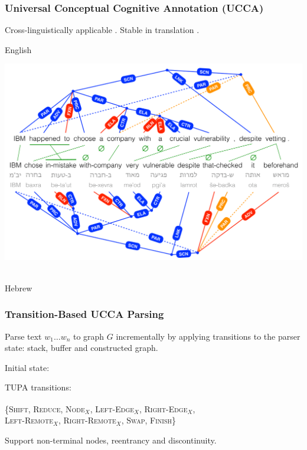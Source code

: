 \documentclass[t,xcolor={svgnames}]{beamer}
\newcommand{\parser}[1]{TUPA\textsubscript{#1}}
\begin{document}
\begin{frame}
\frametitle{Universal Conceptual Cognitive Annotation (UCCA)}
Cross-linguistically applicable \cite{abend2013universal}.
Stable in translation \cite{sulem2015conceptual}.

\vfill
English\\
\vspace{-1cm}
\begin{adjustbox}{center}
  \includegraphics[width=\textwidth,height=\textheight,keepaspectratio]{crosslinguistic.png}
\end{adjustbox}
\\
\vspace{-1cm}
Hebrew
\end{frame}

\begin{frame}
\frametitle{Transition-Based UCCA Parsing}
Parse text $w_1 \ldots w_n$ to graph $G$ incrementally by applying transitions to the parser state:
stack, buffer and constructed graph.

\vfill
Initial state:

\vfill
\parser{} \cite{hershcovich2017a} transitions:

\{\textsc{Shift, Reduce, Node$_X$, Left-Edge$_X$, Right-Edge$_X$,}\\
\hspace{5mm}\textsc{Left-Remote$_X$, Right-Remote$_X$, Swap, Finish}\}

\vfill
Support {\color{blue}non-terminal nodes}, {\color{orange}reentrancy} and {\color{red}discontinuity}.
\end{frame}
\end{document}
